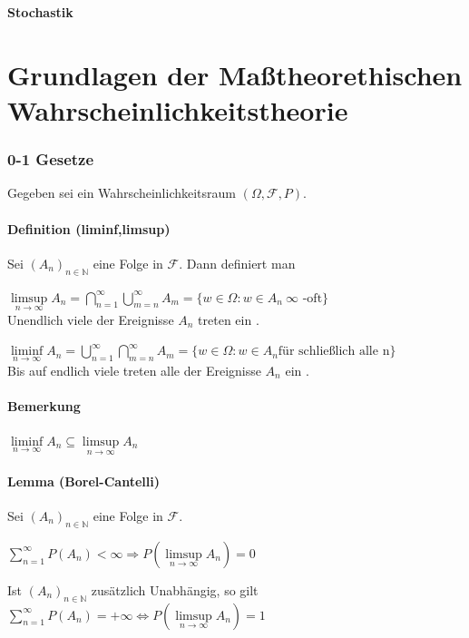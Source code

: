 \documentclass[german,10pt,oneside, fleqn, a4paper]{article}
\newcommand {\N}	{\mathbb{N}}
\newcommand{\brc}[1]{\left(#1\right)}
\newcommand{\mc}[1]{\mathcal{#1}}
\newcommand{\1}[1]{1_{#1}}
\newcommand{\2}[1]{\1{\brac{#1}}}
\newcommand{\raum}{\brc{\Omega,\mc{F},P}}
\newcommand{\f}{\mc{F}}
\begin{document}
    
\vspace{0.5cm}
\begin{center}
{\bf \Large Stochastik } \\[2ex]
\end{center} 
\tableofcontents
\pagebreak




\part{Grundlagen der Maßtheorethischen Wahrscheinlichkeitstheorie}



\section{0-1 Gesetze}
Gegeben sei ein Wahrscheinlichkeitsraum $\raum$.\\

\subsection{Definition (liminf,limsup)}
Sei $(A_n)_{n\in\N}$ eine Folge in $\f$. Dann definiert man 
\begin{list}{}{}
\item \(\limsup\limits_{n\rightarrow \infty}A_n=\bigcap\limits_{n=1}^\infty\bigcup\limits_{m=n}^\infty A_m=\lbrace w\in \Omega:w \in A_n\ \infty\text{ -oft}\rbrace\) \\ 
\glqq Unendlich viele der Ereignisse $A_n$ treten ein \grqq.
\item \(\liminf\limits_{n\rightarrow\infty}A_n=\bigcup\limits_{n=1}^\infty\bigcap\limits_{m=n}^\infty A_m=\lbrace w\in \Omega:w \in A_n\text{für schließlich alle n}\rbrace\) \\
\glqq Bis auf endlich viele treten alle der Ereignisse $A_n$ ein \grqq.
\end{list}

\subsection{Bemerkung}
$\liminf\limits_{n\rightarrow\infty}A_n\subseteq \limsup\limits_{n\rightarrow\infty}A_n$

\subsection{Lemma (Borel-Cantelli)}
Sei $(A_n)_{n\in\N}$ eine Folge in $\f$. 
\begin{list}{}{}
\item $\sum\limits_{n=1}^\infty P(A_n) < \infty\Rightarrow P(\limsup\limits_{n\rightarrow\infty}A_n)=0$
\item Ist $(A_n)_{n\in\N}$ zusätzlich Unabhängig, so gilt $\sum\limits_{n=1}^\infty P(A_n) = +\infty\Leftrightarrow P(\limsup\limits_{n\rightarrow\infty}A_n)=1$
\end{list}
\end{document}
